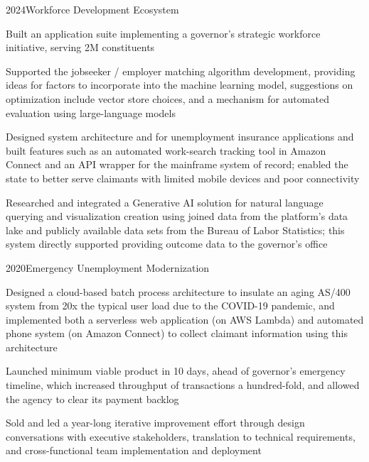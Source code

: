 \project
  {2024}{Workforce Development Ecosystem}
  {\begin{achievements}
    \item Built an application suite implementing a governor's strategic workforce initiative, serving 2M constituents
    \item Supported the jobseeker / employer matching algorithm development, providing ideas for factors to incorporate into the machine learning model, suggestions on optimization include vector store choices, and a mechanism for automated evaluation using large-language models
    \item Designed system architecture and for unemployment insurance applications and built features such as an automated work-search tracking tool in Amazon Connect and an API wrapper for the mainframe system of record; enabled the state to better serve claimants with limited mobile devices and poor connectivity
    \item Researched and integrated a Generative AI solution for natural language querying and visualization creation using joined data from the platform's data lake and publicly available data sets from the Bureau of Labor Statistics; this system directly supported providing outcome data to the governor's office
  \end{achievements}}

\project
  {2020}{Emergency Unemployment Modernization}
  {\begin{achievements}
    \item Designed a cloud-based batch process architecture to insulate an aging AS/400 system from 20x the typical user load due to the COVID-19 pandemic, and implemented both a serverless web application (on AWS Lambda) and automated phone system (on Amazon Connect) to collect claimant information using this architecture
    \item Launched minimum viable product in 10 days, ahead of governor's emergency timeline, which increased throughput of transactions a hundred-fold, and allowed the agency to clear its payment backlog
    \item Sold and led a year-long iterative improvement effort through design conversations with executive stakeholders, translation to technical requirements, and cross-functional team implementation and deployment
  \end{achievements}}

